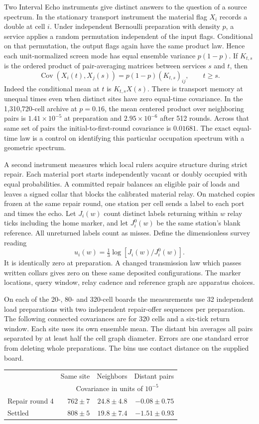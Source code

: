 \documentclass[11pt]{article}
\theoremstyle{remark}
\begin{document}
Two Interval Echo instruments give distinct answers to the question of a
source spectrum. In the stationary transport instrument the material flag
$X_i$ records a double at cell $i$. Under independent Bernoulli preparation
with density $p$, a service applies a random permutation independent of
the input flags. Conditional on that permutation, the output flags again
have the same product law. Hence each unit-normalized screen mode has
equal ensemble variance $p(1-p)$. If $K_{t,s}$ is the ordered product of
pair-averaging matrices between services $s$ and $t$, then
\[
 \operatorname{Cov}(X_i(t),X_j(s))=p(1-p)(K_{t,s})_{ij},\qquad t\ge s.
\]
Indeed the conditional mean at $t$ is $K_{t,s}X(s)$. There is transport
memory at unequal times even when distinct sites have zero equal-time
covariance. In the 1,310,720-cell archive at $p=0.16$, the mean centered
product over neighboring pairs is $1.41\times10^{-5}$ at preparation and
$2.95\times10^{-6}$ after 512 rounds. Across that same set of pairs the
initial-to-first-round covariance is $0.01681$. The exact equal-time law
is a control on identifying this particular occupation spectrum with a
geometric spectrum.

A second instrument measures which local rulers acquire structure during
strict repair. Each material port starts independently vacant or doubly
occupied with equal probabilities. A committed repair balances an eligible
pair of loads and leaves a signed collar that blocks the calibrated
material relay. On matched copies frozen at the same repair round, one
station per cell sends a label to each port and times the echo. Let $J_i(w)$
count distinct labels returning within $w$ relay ticks including the home
marker, and let $J_i^0(w)$ be the same station's blank reference. All
unreturned labels count as misses. Define the dimensionless survey reading
\[
 u_i(w)=\tfrac13\log[J_i(w)/J_i^0(w)].
\]
It is identically zero at preparation. A changed transmission law which
passes written collars gives zero on these same deposited configurations.
The marker locations, query window, relay cadence and reference graph are
apparatus choices.

On each of the 20-, 80- and 320-cell boards the measurements use 32
independent load preparations with two independent repair-offer sequences
per preparation. The following connected covariances are for 320 cells
and a six-tick return window. Each site uses its own ensemble mean.
The distant bin averages all pairs separated by at least half the cell
graph diameter. Errors are one standard error from deleting whole
preparations. The bins use contact distance on the supplied board.
\begin{center}
\begin{tabular}{lrrr}
\hline
 & Same site & Neighbors & Distant pairs \\
 & \multicolumn{3}{c}{Covariance in units of $10^{-5}$} \\
\hline
Repair round 4 & $762\pm7$ & $24.8\pm4.8$ & $-0.08\pm0.75$\\
Settled & $808\pm5$ & $19.8\pm7.4$ & $-1.51\pm0.93$\\
\hline
\end{tabular}
\end{center}
\end{document}
